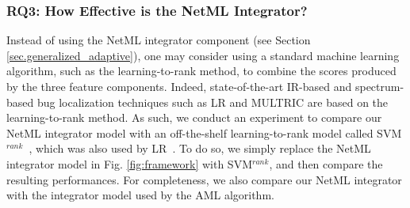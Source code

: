 



\subsubsection{RQ3: How Effective is the NetML Integrator?}

Instead of using the NetML integrator component (see Section \ref{sec.generalized_adaptive}), one may consider using a standard machine learning algorithm, such as the learning-to-rank method, to combine the scores produced by the three feature components. Indeed, state-of-the-art IR-based and spectrum-based bug localization techniques such as LR and MULTRIC are based on the learning-to-rank method. As such, we conduct an experiment to compare our NetML integrator model with an off-the-shelf learning-to-rank model called SVM$^{rank}$~\cite{svmrank}, which was also used by LR~\cite{YeBL14}. To do so, we simply replace the NetML integrator model in Fig. \ref{fig:framework} with SVM$^{rank}$, and then compare the resulting performances. For completeness, we also compare our NetML integrator with the integrator model used by the AML algorithm.

